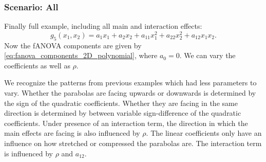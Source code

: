 \subsubsection*{Scenario: All}
Finally full example, including all main and interaction effects:
$$g_5(x_1, x_2) = a_1 x_1 + a_2 x_2 + a_{11} x_1^2 + a_{22} x_2^2 + a_{12} x_1 x_2.$$
Now the fANOVA components are given by \autoref{eq:fanova_components_2D_polynomial}, where $a_0 = 0$.
We can vary the coefficients as well as $\rho$.\par
We recognize the patterns from previous examples which had less parameters to vary.
Whether the parabolas are facing upwards or downwards is determined by the sign of the quadratic coefficients.
Whether they are facing in the same direction is determined by between variable sign-difference of the quadratic coefficients.
Under presence of an interaction term,
the direction in which the main effects are facing is also influenced by $\rho$.
The linear coefficients only have an influence on how stretched or compressed the parabolas are.
The interaction term is influenced by $\rho$ and $a_{12}$.\par
